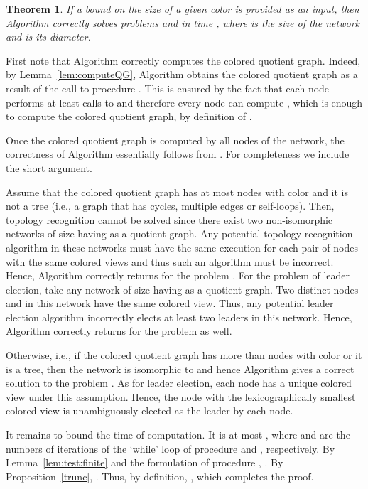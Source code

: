 \documentclass[a4paper,10pt]{article}
\newtheorem{theorem}{Theorem}[section]
\newenvironment{proof}[1][Proof]
{\par\noindent{\bf #1:} }{\hspace*{\fill}\nolinebreak{}\bigskip\par}
\begin{document}
\begin{theorem} \label{thm:main}
If a bound  on the size of a given color  is provided as an input, then Algorithm  correctly solves problems  and  in time , where  is the size of the network and  is its diameter.
\end{theorem}
\begin{proof}
First note that Algorithm  correctly computes the colored quotient graph.
Indeed, by Lemma~\ref{lem:computeQG}, Algorithm  obtains the colored quotient graph  as a result of the call to procedure .
This is ensured by the fact that each node performs at least  calls to  and therefore every node  can compute , which is enough to compute the colored quotient graph, by definition of .

Once the colored quotient graph is computed by all nodes of the network, the correctness of Algorithm  essentially follows from \cite{YK3}.
For completeness we include the short argument.

Assume that the colored quotient graph has at most  nodes with color  and it is not a tree (i.e., a graph {that has} cycles, multiple edges or self-loops).
Then, topology recognition cannot be solved since there exist two non-isomorphic networks of size  having  as a quotient graph.
Any potential topology recognition algorithm in these networks must have the same execution for each pair of nodes with the same colored views and thus such an algorithm must be incorrect.
Hence, Algorithm  correctly returns  for the problem .
For the problem of leader election, take any network of size  having  as a quotient graph.
Two distinct nodes  and  in this network have the same colored view.
Thus, any potential leader election algorithm incorrectly elects at least two leaders in this network.
Hence, Algorithm  correctly returns  for the problem  as well.


Otherwise, i.e., if the colored quotient graph has more than  nodes with color  or it is a tree, then the network is isomorphic to  and hence Algorithm  gives a correct solution to the problem .
As for leader election, each node has a unique colored view under this assumption.
Hence, the node with the lexicographically smallest colored view is unambiguously elected as the leader by each node.

It remains to bound the time of computation.
It is at most , where  and  are the numbers of iterations of the `while' loop of procedure  and , respectively.
By Lemma~\ref{lem:test:finite} and the formulation of procedure , .
By Proposition~\ref{trunc}, .
Thus, by definition, , which completes the proof.
\end{proof}
\end{document}
